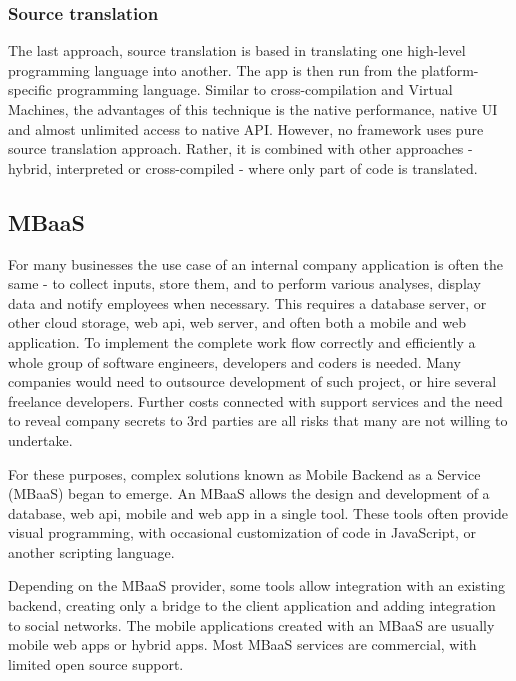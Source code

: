 \documentclass[english,master,public,dept460,male,cpdeclaration,oneside]{diploma}
\begin{document}
\subsubsection{Source translation}
The last approach, source translation is based in translating one high-level programming language into another. The app is then run from the platform-specific programming language. Similar to cross-compilation and Virtual Machines, the advantages of this technique is the native performance, native UI and almost unlimited access to native API. However, no framework uses pure source translation approach. Rather, it is combined with other approaches - hybrid, interpreted or cross-compiled - where only part of code is translated.

\subsection{MBaaS}
For many businesses the use case of an internal company application is often the same - to collect inputs, store them, and to perform various analyses, display data and notify employees when necessary. This requires a database server, or other cloud storage, web api, web server, and often both a mobile and web application. To implement the complete work flow correctly and efficiently a whole group of software engineers, developers and coders is needed. Many companies would need to outsource development of such project, or hire several freelance developers. Further costs connected with support services and the need to reveal company secrets to 3rd parties are all risks that many are not willing to undertake.

For these purposes, complex solutions known as Mobile Backend as a Service (MBaaS) began to emerge. An MBaaS allows the design and development of a database, web api, mobile and web app in a single tool. These tools often provide visual programming, with occasional customization of code in JavaScript, or another scripting language. 

Depending on the MBaaS provider, some tools allow integration with an existing backend, creating only a bridge to the client application and adding integration to social networks. The mobile applications created with an MBaaS are usually mobile web apps or hybrid apps. Most MBaaS services are commercial, with limited open source support.
\end{document}

